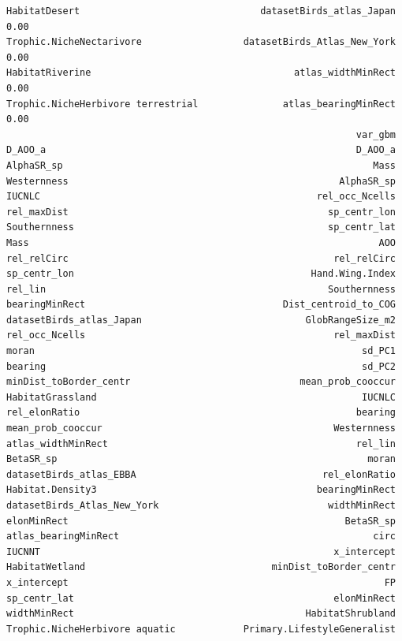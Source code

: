 \documentclass[
  letterpaper,
  DIV=11,
  numbers=noendperiod]{scrreprt}
\begin{document}
\begin{verbatim}
HabitatDesert                                datasetBirds_atlas_Japan    0.00
Trophic.NicheNectarivore                  datasetBirds_Atlas_New_York    0.00
HabitatRiverine                                    atlas_widthMinRect    0.00
Trophic.NicheHerbivore terrestrial               atlas_bearingMinRect    0.00
                                                              var_gbm
D_AOO_a                                                       D_AOO_a
AlphaSR_sp                                                       Mass
Westernness                                                AlphaSR_sp
IUCNLC                                                 rel_occ_Ncells
rel_maxDist                                              sp_centr_lon
Southernness                                             sp_centr_lat
Mass                                                              AOO
rel_relCirc                                               rel_relCirc
sp_centr_lon                                          Hand.Wing.Index
rel_lin                                                  Southernness
bearingMinRect                                   Dist_centroid_to_COG
datasetBirds_atlas_Japan                             GlobRangeSize_m2
rel_occ_Ncells                                            rel_maxDist
moran                                                          sd_PC1
bearing                                                        sd_PC2
minDist_toBorder_centr                              mean_prob_cooccur
HabitatGrassland                                               IUCNLC
rel_elonRatio                                                 bearing
mean_prob_cooccur                                         Westernness
atlas_widthMinRect                                            rel_lin
BetaSR_sp                                                       moran
datasetBirds_atlas_EBBA                                 rel_elonRatio
Habitat.Density3                                       bearingMinRect
datasetBirds_Atlas_New_York                              widthMinRect
elonMinRect                                                 BetaSR_sp
atlas_bearingMinRect                                             circ
IUCNNT                                                    x_intercept
HabitatWetland                                 minDist_toBorder_centr
x_intercept                                                        FP
sp_centr_lat                                              elonMinRect
widthMinRect                                         HabitatShrubland
Trophic.NicheHerbivore aquatic            Primary.LifestyleGeneralist

\end{verbatim}
\end{document}
